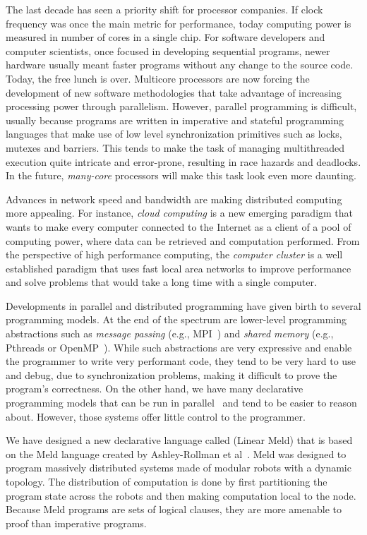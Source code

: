 
The last decade has seen a priority shift for processor companies. If clock frequency
was once the main metric for performance, today computing power is measured in number of
cores in a single chip.
For software developers and computer scientists, once focused in developing sequential programs,
newer hardware usually meant faster programs without any change to the source code. Today,
the free lunch is over. Multicore processors are now forcing the development of
new software methodologies that take advantage of increasing processing power through parallelism.
However, parallel programming is difficult, usually because programs are written
in imperative and stateful programming languages that make use of low level synchronization
primitives such as locks, mutexes and barriers. This tends to make the task of managing multithreaded
execution quite intricate and error-prone, resulting in race hazards and deadlocks.
In the future, \emph{many-core} processors will make this task look even more daunting.

Advances in network speed and bandwidth are making distributed computing
more appealing. For instance, \emph{cloud computing} is a new emerging paradigm that wants
to make every computer connected to the Internet as a client of a pool of computing power,
where data can be retrieved and computation performed. From the perspective of high performance
computing, the \emph{computer cluster} is a well established paradigm that uses fast local area
networks to improve performance and solve problems that would take a long time with a single computer.

Developments in parallel and distributed programming have given birth to several programming models.
At the end of the spectrum are lower-level programming abstractions such as
\emph{message passing} (e.g., MPI~\cite{gabriel04-open-mpi}) and \emph{shared memory}
(e.g., Pthreads or OpenMP~\cite{Chapman-2007-UOP-1370966}).
While such abstractions are very expressive and enable the programmer to write very performant code,
they tend to be very hard to use and debug, due to synchronization problems, making it difficult to
prove the program's correctness. On the other hand, we have many declarative programming models
that can be run in parallel~\cite{Blelloch:1996:PPA:227234.227246} and tend to be easier to reason about.
However, those systems offer little control to the programmer.

We have designed a new declarative language called \lang (Linear Meld) that is based on the Meld language
created by Ashley-Rollman et al~\cite{ashley-rollman-iclp09, ashley-rollman-derosa-iros07wksp}. Meld
was designed to program massively distributed systems made of modular robots with a dynamic topology.
The distribution of computation is done by first partitioning the program state across the robots
and then making computation local to the node. Because Meld programs are sets of logical clauses, they
are more amenable to proof than imperative programs.

